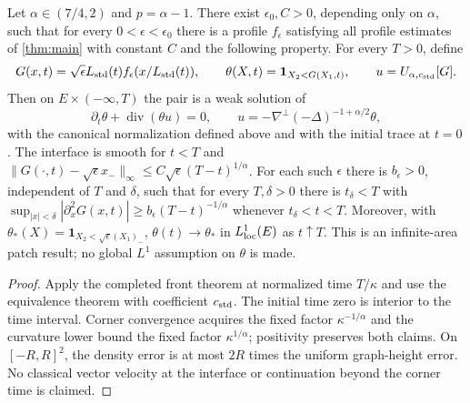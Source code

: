 \begin{theorem}
  \label{thm:c13_patch_main}
  Let $\alpha\in(7/4,2)$ and $p=\alpha-1$. There exist $\epsilon_0,C>0$, depending only on
  $\alpha$, such that for every $0<\epsilon<\epsilon_0$ there is a profile $f_\epsilon$
  satisfying all profile estimates of \cref{thm:main} with constant $C$ and the following property.
  For every $T>0$, define
  \[
    G(x,t)=\sqrt\epsilon L_{\rm std}(t)f_\epsilon(x/L_{\rm std}(t)),\qquad
    \theta(X,t)=\mathbf1_{X_2<G(X_1,t)},\qquad u=U_{\alpha,c_{\rm std}}[G].
  \]
  Then on $E\times(-\infty,T)$ the pair is a weak solution of
  \[
    \partial_t\theta+\operatorname{div}(\theta u)=0,\qquad
    u=-\nabla^\perp(-\Delta)^{-1+\alpha/2}\theta,
  \]
  with the canonical normalization defined above and with the initial trace at $t=0$.
  The interface is smooth for $t<T$ and
  $\|G(\cdot,t)-\sqrt\epsilon x_-\|_\infty\le C\sqrt\epsilon(T-t)^{1/\alpha}$.
  For each such $\epsilon$ there is $b_\epsilon>0$, independent of $T$ and $\delta$, such that
  for every $T,\delta>0$ there is $t_\delta<T$ with
  $\sup_{|x|<\delta}|\partial_x^2G(x,t)|\ge b_\epsilon(T-t)^{-1/\alpha}$
  whenever $t_\delta<t<T$.
  Moreover, with $\theta_*(X)=\mathbf1_{X_2<\sqrt\epsilon(X_1)_-}$,
  $\theta(t)\to\theta_*$ in $L^1_{\rm loc}(E)$ as $t\uparrow T$.
  This is an infinite-area patch result; no global $L^1$ assumption on $\theta$ is made.
\end{theorem}
\begin{proof}
  Apply the completed front theorem at normalized time $T/\kappa$ and use the equivalence theorem
  with coefficient $c_{\rm std}$. The initial time zero is interior to the time interval.
  Corner convergence acquires the fixed factor $\kappa^{-1/\alpha}$ and the curvature lower bound
  the fixed factor $\kappa^{1/\alpha}$; positivity preserves both claims.
  On $[-R,R]^2$, the density error is at most $2R$ times the uniform graph-height error.
  No classical vector velocity at the interface or continuation beyond the corner time is claimed.
\end{proof}
